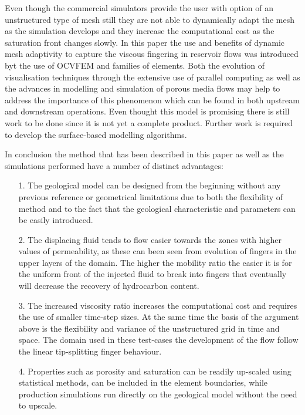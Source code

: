 \documentclass[preprint,authoryear,12pt]{elsarticle}
\begin{document}
{Even though the commercial simulators provide the user with option of an unstructured type of mesh still they are not able to dynamically adapt the mesh as the simulation develops and they increase the computational cost as the saturation front changes slowly. In this paper the use and benefits of dynamic mesh adaptivity to capture the viscous fingering in reservoir flows was introduced byt the use of OCVFEM and families of elements. Both the evolution of visualisation techniques through the extensive use of parallel computing as well as the advances in modelling and simulation of porous media flows may help to address the importance of this phenomenon which can be found in both upstream and downstream operations. Even thought this model is promising there is still work to be done since it is not yet a complete product. Further work is required to develop the surface-based modelling algorithms.

In conclusion the method that has been described in this paper as well as the simulations performed have a number of distinct advantages: 
\begin{enumerate}
\item[1.] The geological model can be designed from the beginning without any previous reference or geometrical limitations due to both the flexibility of method and to the fact that the geological characteristic and parameters can be easily introduced.

\item[2.] The displacing fluid tends to flow easier towards the zones with higher values of permeability, as these can been seen from evolution of fingers in the upper layers of the domain. The higher the mobility ratio the easier it is for the uniform front of the injected fluid to break into fingers that eventually will decrease the recovery of hydrocarbon content.
\item[3.] The increased viscosity ratio increases the computational cost and requires the use of smaller time-step sizes. At the same time the basis of the argument above is the flexibility and variance of the unstructured grid in time and space. The domain used in these test-cases the development of the flow follow the linear tip-splitting finger behaviour.
\item[4.] Properties such as porosity and saturation can be readily up-scaled using statistical methods, can be included in the element boundaries,  while production simulations run directly on the geological model without the need to upscale.
\end{enumerate}



}
\end{document}
